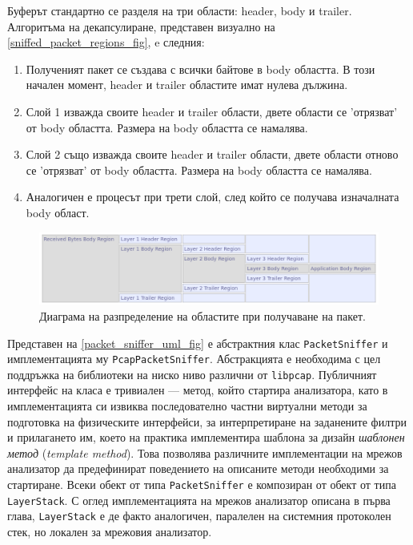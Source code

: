 \documentclass[12pt,a4paper,oneside]{book}
\begin{document}
Буферът стандартно се разделя на три области: header, body и trailer.
Алгоритъма на декапсулиране, представен визуално на
\autoref{sniffed_packet_regions_fig}, e следния:

\begin{enumerate}
  \item
    Полученият пакет се създава с всички байтове в body областта. В този начален
    момент, header и trailer областите имат нулева дължина.
\item
  Слой 1 изважда своите header и trailer области, двете области се 'отрязват' от
  body областта. Размера на body областта се намалява.
\item
  Слой 2 също изважда своите header и trailer области, двете области отново се
  'отрязват' от body областта. Размера на body областта се намалява.
\item
  Аналогичен е процесът при трети слой, след който се получава изначалната body
  област.
\end{enumerate}

\begin{figure}[h!]
  \centering
  \includegraphics[width=\textwidth]{figures/sniffed_packet_regions.png}
  \caption{Диаграма на разпределение на областите при получаване на пакет.}
  \label{sniffed_packet_regions_fig}
\end{figure}

Представен на \autoref{packet_sniffer_uml_fig} е абстрактния клас
\texttt{PacketSniffer} и имплементацията му \texttt{PcapPacketSniffer}.
Абстракцията е необходима с цел поддръжка на библиотеки на ниско ниво различни
от \texttt{libpcap}.  Публичният интерфейс на класа е тривиален --- метод,
който стартира анализатора, като в имплементацията си извиква последователно
частни виртуални методи за подготовка на физическите интерфейси, за
интерпретиране на заданените филтри и прилагането им, което на практика
имплементира шаблона за дизайн \textit{шаблонен метод} (\textit{template method}).
\cite{gamma_design_1995} Това позволява
различните имплементации на мрежов анализатор да предефинират поведението на
описаните методи необходими за стартиране.
Всеки обект от типа \texttt{PacketSniffer} е композиран от обект от типа
\texttt{LayerStack}. С оглед имплементацията на мрежов анализатор описана в
първа глава, \texttt{LayerStack} е де факто аналогичен, паралелен на системния
протоколен стек, но локален за мрежовия анализатор.
\end{document}
